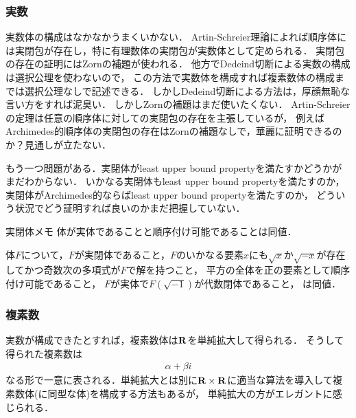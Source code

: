 \subsubsection{実数}
	実数体の構成はなかなかうまくいかない．
	Artin-Schreier理論によれば順序体には実閉包が存在し，特に有理数体の実閉包が実数体として定められる．
	実閉包の存在の証明にはZornの補題が使われる．
	他方でDedeind切断による実数の構成は選択公理を使わないので，
	この方法で実数体を構成すれば複素数体の構成までは選択公理なしで記述できる．
	しかしDedeind切断による方法は，厚顔無恥な言い方をすれば泥臭い．
	しかしZornの補題はまだ使いたくない．
	Artin-Schreierの定理は任意の順序体に対しての実閉包の存在を主張しているが，
	例えばArchimedes的順序体の実閉包の存在はZornの補題なしで，華麗に証明できるのか？見通しが立たない．
	
	もう一つ問題がある．実閉体がleast upper bound propertyを満たすかどうかがまだわからない． 
	いかなる実閉体もleast upper bound propertyを満たすのか，実閉体がArchimedes的ならばleast upper bound propertyを満たすのか，
	どういう状況でどう証明すれば良いのかまだ把握していない．
	
	\begin{itembox}[l]{実閉体メモ}
		体が実体であることと順序付け可能であることは同値．
		
		体$F$について，$F$が実閉体であること，$F$のいかなる要素$x$にも$\sqrt{x}$か$\sqrt{-x}$が存在してかつ奇数次の多項式が$F$で解を持つこと，
		平方の全体を正の要素として順序付け可能であること，
		$F$が実体で$F(\sqrt{-1})$が代数閉体であること，
		は同値．
	\end{itembox}
	
\subsubsection{複素数}
	実数が構成できたとすれば，複素数体は$\mathbf{R}$を単純拡大して得られる．
	そうして得られた複素数は
	\begin{align}
		\alpha + \beta i
	\end{align}
	なる形で一意に表される．単純拡大とは別に$\mathbf{R} \times \mathbf{R}$に適当な算法を導入して複素数体(に同型な体)を構成する方法もあるが，
	単純拡大の方がエレガントに感じられる．

\newpage